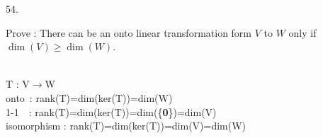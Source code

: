 \documentclass[12pt]{book}
\begin{document}
\begin{CJK}{UTF8}{bsmi}
54. \begin{minipage}[t]{\dimexpr\linewidth-2em}
Prove : There can be an onto linear transformation form $V$ to $W$ only if $\dim(V)\ge\dim(W)$.
\end{minipage}\\

T : V$\rightarrow$W \\
onto\  : rank(T)=dim(ker(T))=dim(W) \\
1-1\ \ : rank(T)=dim(ker(T))=dim(\{\textbf{0}\})=dim(V) \\
isomorphism : rank(T)=dim(ker(T))=dim(V)=dim(W)

\end{CJK}
\end{document}
